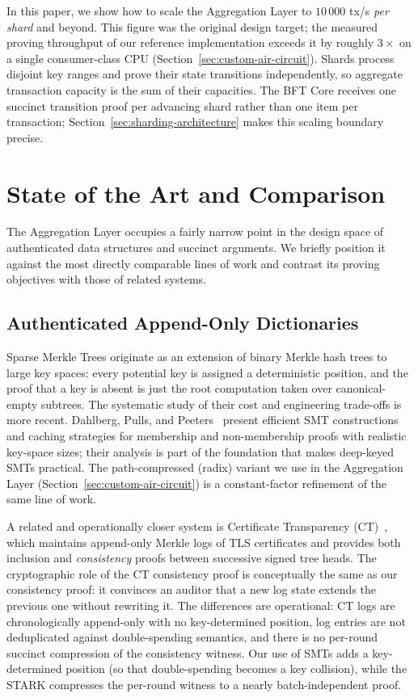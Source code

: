 \documentclass[twocolumn]{article}
\begin{document}
In this paper, we show how to scale the Aggregation Layer to $10\,000$ tx/s \emph{per shard} and beyond. This figure was the original design target; the measured proving throughput of our reference implementation exceeds it by roughly $3\times$ on a single consumer-class CPU (Section~\ref{sec:custom-air-circuit}). Shards process disjoint key ranges and prove their state transitions independently, so aggregate transaction capacity is the sum of their capacities. The BFT Core receives one succinct transition proof per advancing shard rather than one item per transaction; Section~\ref{sec:sharding-architecture} makes this scaling boundary precise.


\section{State of the Art and Comparison}
\label{sec:sota}

The Aggregation Layer occupies a fairly narrow point in the design space of authenticated data structures and succinct arguments. We briefly position it against the most directly comparable lines of work and contrast its proving objectives with those of related systems.

\subsection{Authenticated Append-Only Dictionaries}

Sparse Merkle Trees originate as an extension of binary Merkle hash trees to large key spaces: every potential key is assigned a deterministic position, and the proof that a key is absent is just the root computation taken over canonical-empty subtrees. The systematic study of their cost and engineering trade-offs is more recent. Dahlberg, Pulls, and Peeters~\cite{dahlberg2016smt} present efficient SMT constructions and caching strategies for membership and non-membership proofs with realistic key-space sizes; their analysis is part of the foundation that makes deep-keyed SMTs practical. The path-compressed (radix) variant we use in the Aggregation Layer (Section~\ref{sec:custom-air-circuit}) is a constant-factor refinement of the same line of work.

A related and operationally closer system is Certificate Transparency (CT)~\cite{rfc6962}, which maintains append-only Merkle logs of TLS certificates and provides both inclusion and \emph{consistency} proofs between successive signed tree heads. The cryptographic role of the CT consistency proof is conceptually the same as our consistency proof: it convinces an auditor that a new log state extends the previous one without rewriting it. The differences are operational: CT logs are chronologically append-only with no key-determined position, log entries are not deduplicated against double-spending semantics, and there is no per-round succinct compression of the consistency witness. Our use of SMTs adds a key-determined position (so that double-spending becomes a key collision), while the STARK compresses the per-round witness to a nearly batch-independent proof.
\end{document}
